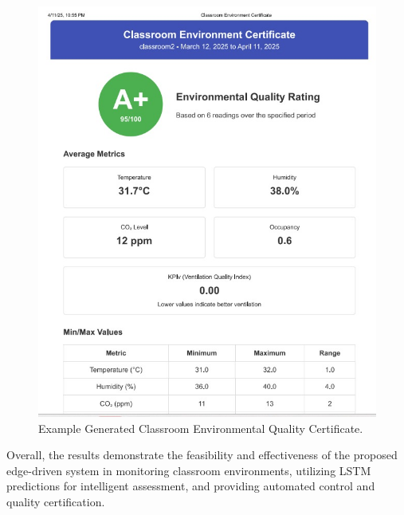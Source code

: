 \begin{figure}[t]
  \centering
  \includegraphics[width=\columnwidth]{figures/image (4).png} %
  \caption{Example Generated Classroom Environmental Quality Certificate.}
  \label{fig:certificate_example}
\end{figure}

Overall, the results demonstrate the feasibility and effectiveness of the proposed edge-driven system in monitoring classroom environments, utilizing LSTM predictions for intelligent assessment, and providing automated control and quality certification. 